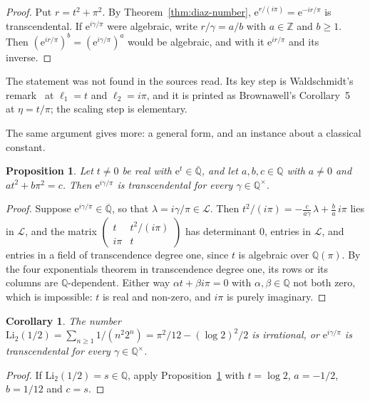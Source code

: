 \documentclass[11pt,a4paper]{article}
\theoremstyle{plain}
\newtheorem{corollary}[theorem]{Corollary}
\newtheorem{proposition}[theorem]{Proposition}
\theoremstyle{definition}
\newcommand{\e}{\mathrm{e}}
\newcommand{\Q}{\mathbb{Q}}
\newcommand{\Z}{\mathbb{Z}}
\newcommand{\Alg}{\overline{\mathbb{Q}}}
\newcommand{\Logs}{\mathcal{L}}
\begin{document}
\begin{proof}
Put $r=t^{2}+\pi^{2}$. By Theorem~\ref{thm:diaz-number}, $\e^{r/(i\pi)}=\e^{-ir/\pi}$ is
transcendental. If $\e^{i\gamma/\pi}$ were algebraic, write $r/\gamma=a/b$ with $a\in\Z$ and
$b\ge1$. Then $(\e^{ir/\pi})^{b}=(\e^{i\gamma/\pi})^{a}$ would be algebraic, and with it
$\e^{ir/\pi}$ and its inverse.
\end{proof}

The statement was not found in the sources read. Its key step is Waldschmidt's
remark~\cite[p.~202]{waldschmidt-1974} at $\ell_{1}=t$ and $\ell_{2}=i\pi$, and it is printed as
Brownawell's Corollary~5~\cite[p.~23]{brownawell-1974} at $\eta=t/\pi$; the scaling step is
elementary.

The same argument gives more: a general form, and an instance about a classical constant.

\begin{proposition}\label{prop:rational-quadric}
Let $t\neq0$ be real with $\e^{t}\in\Alg$, and let $a,b,c\in\Q$ with $a\neq0$ and
$at^{2}+b\pi^{2}=c$. Then $\e^{i\gamma/\pi}$ is transcendental for every $\gamma\in\Q^{\times}$.
\end{proposition}

\begin{proof}
Suppose $\e^{i\gamma/\pi}\in\Alg$, so that $\lambda=i\gamma/\pi\in\Logs$. Then
$t^{2}/(i\pi)=-\frac{c}{a\gamma}\,\lambda+\frac{b}{a}\,i\pi$ lies in $\Logs$, and the matrix
$\begin{pmatrix}t&t^{2}/(i\pi)\\ i\pi&t\end{pmatrix}$ has determinant $0$, entries in $\Logs$, and
entries in a field of transcendence degree one, since $t$ is algebraic over $\Q(\pi)$. By the four
exponentials theorem in transcendence degree one, its rows or its columns are $\Q$-dependent. Either
way $\alpha t+\beta i\pi=0$ with $\alpha,\beta\in\Q$ not both zero, which is impossible: $t$ is real
and non-zero, and $i\pi$ is purely imaginary.
\end{proof}

\begin{corollary}\label{cor:dilog}
The number $\mathrm{Li}_{2}(1/2)=\sum_{n\ge1}1/(n^{2}2^{n})=\pi^{2}/12-(\log2)^{2}/2$ is irrational,
or $\e^{i\gamma/\pi}$ is transcendental for every $\gamma\in\Q^{\times}$.
\end{corollary}

\begin{proof}
If $\mathrm{Li}_{2}(1/2)=s\in\Q$, apply Proposition~\ref{prop:rational-quadric} with $t=\log2$,
$a=-1/2$, $b=1/12$ and $c=s$.
\end{proof}
\end{document}
